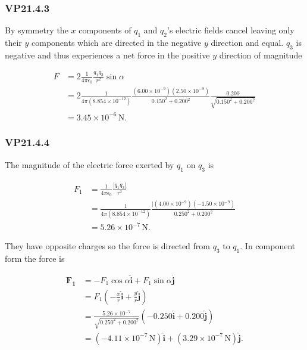 \documentclass{article}
\begin{document}
\subsubsection{VP21.4.3}

By symmetry the $x$ components of $q_1$ and $q_2$'s electric fields cancel leaving only their $y$ components which are directed in the negative $y$ direction and equal. $q_3$ is negative and thus experiences a net force in the positive $y$ direction of magnitude

\begin{align*}
  F & = 2 \frac{1}{4\pi\epsilon_0} \frac{q_1q_3}{r^2} \sin \alpha                                                                                            \\
    & = 2 \frac{1}{4\pi (8.854 \times 10^{-12})} \frac{(6.00 \times 10^{-9})(2.50 \times 10^{-9})}{0.150^2 + 0.200^2} \frac{0.200}{\sqrt{0.150^2 + 0.200^2}} \\
    & = 3.45 \times 10^{-6} \,\textrm{N}.
\end{align*}

\subsubsection{VP21.4.4}

The magnitude of the electric force exerted by $q_1$ on $q_3$ is

\begin{align*}
  F_1 & = \frac{1}{4 \pi \epsilon_0} \frac{|q_1 q_3|}{r^2}                                                                \\
      & = \frac{1}{4 \pi (8.854 \times 10^{-12})} \frac{|(4.00 \times 10^{-9}) (-1.50 \times 10^{-9})}{0.250^2 + 0.200^2} \\
      & = 5.26 \times 10^{-7} \,\textrm{N}.
\end{align*}

They have opposite charges so the force is directed from $q_3$ to $q_1$. In component form the force is

\begin{align*}
  \mathbf{F_1} & = -F_1\cos\alpha\hat{\mathbf{i}} + F_1\sin\alpha\hat{\mathbf{j}}                                                     \\
               & = F_1 \left( -\frac{x}{r}\hat{\mathbf{i}} + \frac{y}{r}\hat{\mathbf{j}} \right)                                      \\
               & = \frac{5.26 \times 10^{-7}}{\sqrt{0.250^2 + 0.200^2}} \left( -0.250\hat{\mathbf{i}} + 0.200\hat{\mathbf{j}} \right) \\
               & = (-4.11 \times 10^{-7}\,\textrm{N}) \hat{\mathbf{i}} + (3.29 \times 10^{-7}\,\textrm{N}) \hat{\mathbf{j}}.
\end{align*}
\end{document}
